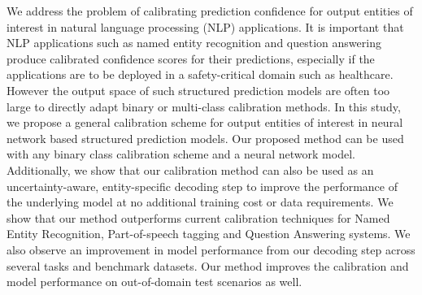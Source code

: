 We address the problem of calibrating prediction confidence for output entities of interest in natural language processing (NLP) applications. It is important that NLP applications such as named entity recognition and question answering produce calibrated confidence scores for their predictions, especially if the applications are to be deployed in a safety-critical domain such as healthcare. However the output space of such structured prediction models are often too large to directly adapt binary or multi-class calibration methods. In this study, we propose a general calibration scheme for output entities of interest in neural network based structured prediction models. Our proposed method can be used with any binary class calibration scheme and a neural network model. Additionally, we show that our calibration method can also be used as an uncertainty-aware, entity-specific decoding step to improve the performance of the underlying model at no additional training cost or data requirements. We show that our method outperforms current calibration techniques for Named Entity Recognition, Part-of-speech tagging and Question Answering systems. We also observe an improvement in model performance from our decoding step across several tasks and benchmark datasets. Our method improves the calibration and model performance on out-of-domain test scenarios as well.
